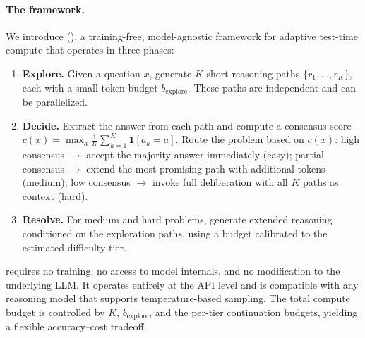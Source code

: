 \paragraph{The \method{} framework.}
We introduce \textbf{\fullmethod{}} (\method{}), a training-free, model-agnostic framework for adaptive test-time compute that operates in three phases:
\begin{enumerate}[nosep,leftmargin=*]
    \item \textbf{Explore.} Given a question $x$, generate $K$ short reasoning paths $\{r_1, \ldots, r_K\}$, each with a small token budget $b_{\text{explore}}$. These paths are independent and can be parallelized.
    \item \textbf{Decide.} Extract the answer from each path and compute a consensus score $c(x) = \max_a \frac{1}{K} \sum_{k=1}^{K} \mathbf{1}[a_k = a]$. Route the problem based on $c(x)$: high consensus $\rightarrow$ accept the majority answer immediately (easy); partial consensus $\rightarrow$ extend the most promising path with additional tokens (medium); low consensus $\rightarrow$ invoke full deliberation with all $K$ paths as context (hard).
    \item \textbf{Resolve.} For medium and hard problems, generate extended reasoning conditioned on the exploration paths, using a budget calibrated to the estimated difficulty tier.
\end{enumerate}
\method{} requires no training, no access to model internals, and no modification to the underlying LLM.
It operates entirely at the API level and is compatible with any reasoning model that supports temperature-based sampling.
The total compute budget is controlled by $K$, $b_{\text{explore}}$, and the per-tier continuation budgets, yielding a flexible accuracy--cost tradeoff.

